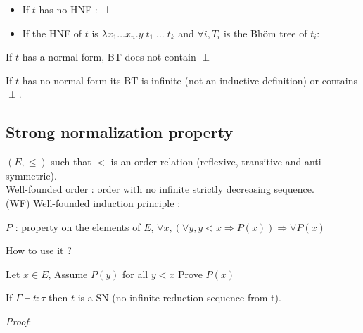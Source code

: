   \begin{itemize}
    \item If $t$ has no HNF : $\perp$
    \item If the HNF of $t$ is $\lambda x_1 \ldots x_n. y\; t_1\;\ldots\;t_k$
      and $\forall i, T_i$ is the Bhöm tree of $t_i$:
  \begin{center}
  \end{center}
  \end{itemize}

  If $t$ has a normal form, BT does not contain $\perp$

  If $t$ has no normal form its BT is infinite (not an inductive definition)
  or contains $\perp$.

  \subsection{Strong normalization property}

  $(E, \leq)$ such that $<$ is an order relation (reflexive, transitive and
  anti-symmetric).\\
  Well-founded order : order with no infinite strictly decreasing sequence. \\
  (WF) Well-founded induction principle :

  $P$ : property on the elements of $E$,
  $\forall x, (\forall y, y < x \Rightarrow P(x)) \Rightarrow \forall P (x)$

  How to use it ?

  Let $x \in E$, Assume $P(y)$ for all $y < x$ Prove $P(x)$

  \lemma
  If $\Gamma \vdash t : \tau$ then $t$ is a SN (no infinite reduction sequence
  from t).

  \textit{Proof}:

  \qedsymbol



